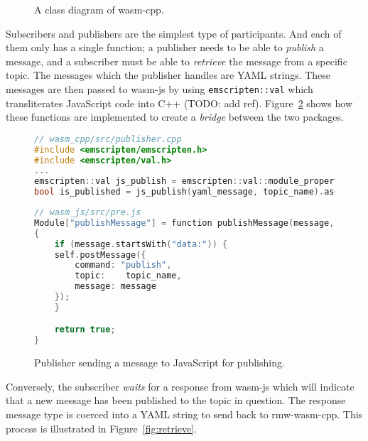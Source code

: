 \begin{figure}[htbp]
            \vspace{1em}
            \caption{A class diagram of \textsf{wasm-cpp}.}
            \label{fig:classes}
        \end{figure}
        

        Subscribers and publishers are the simplest type of participants. And each of them only has a single function; a publisher needs to be able to \textit{publish} a message, and a subscriber must be able to \textit{retrieve} the message from a specific topic. The messages which the publisher handles are \ac{YAML} strings. These messages are then passed to \textsf{wasm-js} by using \texttt{emscripten::val} which transliterates JavaScript code into C++ (TODO: add ref). Figure~\ref{fig:publish} shows how these functions are implemented to create a \textit{bridge} between the two packages.

        \begin{figure}[htbp]
            \centering
            \begin{lstlisting}[language=C++]
// wasm_cpp/src/publisher.cpp
#include <emscripten/emscripten.h>
#include <emscripten/val.h>
...
emscripten::val js_publish = emscripten::val::module_property("publishMessage");
bool is_published = js_publish(yaml_message, topic_name).as<bool>();
\end{lstlisting}

            \begin{lstlisting}[language=C++] 
// wasm_js/src/pre.js
Module["publishMessage"] = function publishMessage(message, topic_name)
{
    if (message.startsWith("data:")) {
    self.postMessage({
        command: "publish",
        topic:    topic_name,
        message: message
    });
    }

    return true;
}
\end{lstlisting}
            \caption{Publisher sending a message to JavaScript for publishing.}
            \label{fig:publish}
        \end{figure}

    Conversely, the subscriber \textit{waits} for a response from \textsf{wasm-js} which will indicate that a new message has been published to the topic in question. The response message type is coerced into a \ac{YAML} string to send back to \textsf{rmw-wasm-cpp}. This process is illustrated in Figure~\ref{fig:retrieve}.


